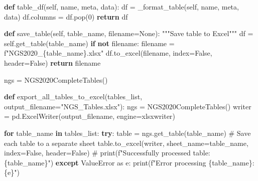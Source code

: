\documentclass[
  11pt,
  a4paper,
]{article}
\newenvironment{Shaded}{\begin{snugshade}}{\end{snugshade}}
\newcommand{\BuiltInTok}[1]{\textcolor[rgb]{0.00,0.23,0.31}{#1}}
\newcommand{\CommentTok}[1]{\textcolor[rgb]{0.37,0.37,0.37}{#1}}
\newcommand{\ControlFlowTok}[1]{\textcolor[rgb]{0.00,0.23,0.31}{\textbf{#1}}}
\newcommand{\DecValTok}[1]{\textcolor[rgb]{0.68,0.00,0.00}{#1}}
\newcommand{\ImportTok}[1]{\textcolor[rgb]{0.00,0.46,0.62}{#1}}
\newcommand{\KeywordTok}[1]{\textcolor[rgb]{0.00,0.23,0.31}{\textbf{#1}}}
\newcommand{\NormalTok}[1]{\textcolor[rgb]{0.00,0.23,0.31}{#1}}
\newcommand{\OperatorTok}[1]{\textcolor[rgb]{0.37,0.37,0.37}{#1}}
\newcommand{\PreprocessorTok}[1]{\textcolor[rgb]{0.68,0.00,0.00}{#1}}
\newcommand{\SpecialCharTok}[1]{\textcolor[rgb]{0.37,0.37,0.37}{#1}}
\newcommand{\SpecialStringTok}[1]{\textcolor[rgb]{0.13,0.47,0.30}{#1}}
\newcommand{\StringTok}[1]{\textcolor[rgb]{0.13,0.47,0.30}{#1}}
\newcommand{\VariableTok}[1]{\textcolor[rgb]{0.07,0.07,0.07}{#1}}
\begin{document}
\begin{Shaded}
\begin{Highlighting}[]
    \KeywordTok{def}\NormalTok{ table\_df(}\VariableTok{self}\NormalTok{, name, meta, data):}
\NormalTok{        df }\OperatorTok{=}\NormalTok{ \_format\_table(}\VariableTok{self}\NormalTok{, name, meta, data)}
\NormalTok{        df.columns }\OperatorTok{=}\NormalTok{ df.pop(}\DecValTok{0}\NormalTok{)}
        \ControlFlowTok{return}\NormalTok{ df}
        
    
    
    \KeywordTok{def}\NormalTok{ save\_table(}\VariableTok{self}\NormalTok{, table\_name, filename}\OperatorTok{=}\VariableTok{None}\NormalTok{):}
        \CommentTok{"""Save table to Excel"""}
\NormalTok{        df }\OperatorTok{=} \VariableTok{self}\NormalTok{.get\_table(table\_name)}
        \ControlFlowTok{if} \KeywordTok{not}\NormalTok{ filename:}
\NormalTok{            filename }\OperatorTok{=} \SpecialStringTok{f"NGS2020\_}\SpecialCharTok{\{}\NormalTok{table\_name}\SpecialCharTok{\}}\SpecialStringTok{.xlsx"}
\NormalTok{        df.to\_excel(filename, index}\OperatorTok{=}\VariableTok{False}\NormalTok{, header}\OperatorTok{=}\VariableTok{False}\NormalTok{)}
        \ControlFlowTok{return}\NormalTok{ filename}


\NormalTok{ngs }\OperatorTok{=}\NormalTok{ NGS2020CompleteTables()}

\KeywordTok{def}\NormalTok{ export\_all\_tables\_to\_excel(tables\_list, output\_filename}\OperatorTok{=}\StringTok{"NGS\_Tables.xlsx"}\NormalTok{):}
\NormalTok{    ngs }\OperatorTok{=}\NormalTok{ NGS2020CompleteTables()}
\NormalTok{    writer }\OperatorTok{=}\NormalTok{ pd.ExcelWriter(output\_filename, engine}\OperatorTok{=}\StringTok{\textquotesingle{}xlsxwriter\textquotesingle{}}\NormalTok{)}
    
    \ControlFlowTok{for}\NormalTok{ table\_name }\KeywordTok{in}\NormalTok{ tables\_list:}
        \ControlFlowTok{try}\NormalTok{:}
\NormalTok{            table }\OperatorTok{=}\NormalTok{ ngs.get\_table(table\_name)}
            \CommentTok{\# Save each table to a separate sheet}
\NormalTok{            table.to\_excel(writer, sheet\_name}\OperatorTok{=}\NormalTok{table\_name, index}\OperatorTok{=}\VariableTok{False}\NormalTok{, header}\OperatorTok{=}\VariableTok{False}\NormalTok{)}
            \CommentTok{\# print(f"Successfully processed table: \{table\_name\}")}
        \ControlFlowTok{except} \PreprocessorTok{ValueError} \ImportTok{as}\NormalTok{ e:}
            \BuiltInTok{print}\NormalTok{(}\SpecialStringTok{f"Error processing }\SpecialCharTok{\{}\NormalTok{table\_name}\SpecialCharTok{\}}\SpecialStringTok{: }\SpecialCharTok{\{}\NormalTok{e}\SpecialCharTok{\}}\SpecialStringTok{"}\NormalTok{)}
    

\end{Highlighting}
\end{Shaded}
\end{document}
